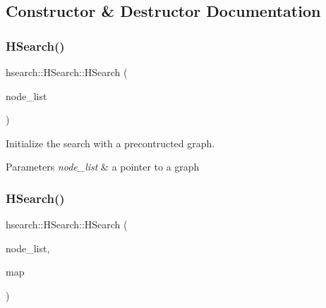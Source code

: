 \subsection{Constructor \& Destructor Documentation}
\mbox{\label{classhsearch_1_1HSearch_a52aed9d8d8c634bd506cfd3c14620884}} 
\subsubsection{\texorpdfstring{H\+Search()}{HSearch()}\hspace{0.1cm}{\footnotesize\ttfamily [1/2]}}
{\footnotesize\ttfamily hsearch\+::\+H\+Search\+::\+H\+Search (\begin{DoxyParamCaption}\item[{std\+::vector$<$ \hyperlink{structprm_1_1Node}{prm\+::\+Node} $>$ $\ast$}]{node\+\_\+list }\end{DoxyParamCaption})}



Initialize the search with a precontructed graph. 


\begin{DoxyParams}{Parameters}
{\em node\+\_\+list} & a pointer to a graph \\
\hline
\end{DoxyParams}
\mbox{\label{classhsearch_1_1HSearch_a5342d4b1648868b600de6f2dda2e6fdc}} 
\subsubsection{\texorpdfstring{H\+Search()}{HSearch()}\hspace{0.1cm}{\footnotesize\ttfamily [2/2]}}
{\footnotesize\ttfamily hsearch\+::\+H\+Search\+::\+H\+Search (\begin{DoxyParamCaption}\item[{std\+::vector$<$ \hyperlink{structprm_1_1Node}{prm\+::\+Node} $>$ $\ast$}]{node\+\_\+list,  }\item[{\hyperlink{structgrid_1_1Map}{grid\+::\+Map}}]{map }\end{DoxyParamCaption})}



